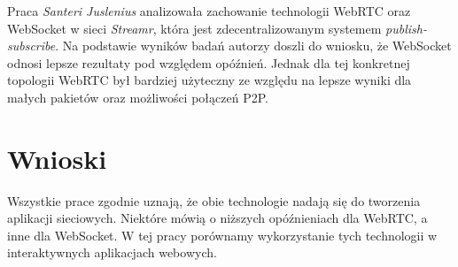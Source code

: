 \documentclass[language=polish,type=master]{aghmodern}
\begin{document}
Praca \cite{websocket_webrtc_streamr} \emph{Santeri Juslenius} analizowała zachowanie technologii WebRTC oraz WebSocket w sieci \emph{Streamr}, która jest zdecentralizowanym systemem \emph{publish-subscribe}\footnotemark{}.
Na podstawie wyników badań autorzy doszli do wniosku, że WebSocket odnosi lepsze rezultaty pod względem opóźnień.
Jednak dla tej konkretnej topologii WebRTC był bardziej użyteczny ze względu na lepsze wyniki dla małych pakietów oraz możliwości połączeń P2P.

\section{Wnioski}
Wszystkie prace zgodnie uznają, że obie technologie nadają się do tworzenia aplikacji sieciowych.
Niektóre mówią o niższych opóźnieniach dla WebRTC, a inne dla WebSocket.
W tej pracy porównamy wykorzystanie tych technologii w interaktywnych aplikacjach webowych.
\end{document}
